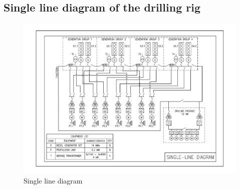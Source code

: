 \newpage
\subsection{Single line diagram of the drilling rig} \label{app:drilling rig}
\begin{figure}[h!]
    \centering
    \includegraphics[scale=0.85, angle=90]{figures/Single_Line_diagram.pdf}
    \caption{Single line diagram}
    \label{fig:SingleLineDiagram}
\end{figure}



